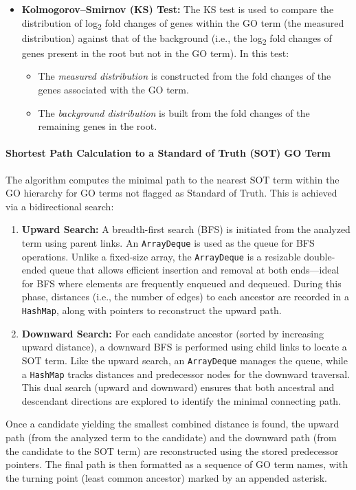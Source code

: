 \documentclass{article}
\begin{document}
\begin{itemize}
        \item \textbf{Kolmogorov–Smirnov (KS) Test:}
        The KS test is used to compare the distribution of log\textsubscript{2} fold changes of genes within the GO term (the measured distribution) against that of the background (i.e., the log\textsubscript{2} fold changes of genes present in the root but not in the GO term). In this test:
        \begin{itemize}
            \item The \textit{measured distribution} is constructed from the fold changes of the genes associated with the GO term.
            \item The \textit{background distribution} is built from the fold changes of the remaining genes in the root.
        \end{itemize}
    \end{itemize}

    \paragraph{Shortest Path Calculation to a Standard of Truth (SOT) GO Term}
    The algorithm computes the minimal path to the nearest SOT term within the GO hierarchy for GO terms not flagged as Standard of Truth. This is achieved via a bidirectional search:
    \begin{enumerate}
        \item \textbf{Upward Search:} A breadth-first search (BFS) is initiated from the analyzed term using parent links. An \texttt{ArrayDeque} is used as the queue for BFS operations. Unlike a fixed-size array, the \texttt{ArrayDeque} is a resizable double-ended queue that allows efficient insertion and removal at both ends—ideal for BFS where elements are frequently enqueued and dequeued\cite{geeksforgeeks_2023}. During this phase, distances (i.e., the number of edges) to each ancestor are recorded in a \texttt{HashMap}, along with pointers to reconstruct the upward path.
        \item \textbf{Downward Search:} For each candidate ancestor (sorted by increasing upward distance), a downward BFS is performed using child links to locate a SOT term. Like the upward search, an \texttt{ArrayDeque} manages the queue, while a \texttt{HashMap} tracks distances and predecessor nodes for the downward traversal. This dual search (upward and downward) ensures that both ancestral and descendant directions are explored to identify the minimal connecting path.
    \end{enumerate}
    Once a candidate yielding the smallest combined distance is found, the upward path (from the analyzed term to the candidate) and the downward path (from the candidate to the SOT term) are reconstructed using the stored predecessor pointers. The final path is then formatted as a sequence of GO term names, with the turning point (least common ancestor) marked by an appended asterisk.
\end{document}
